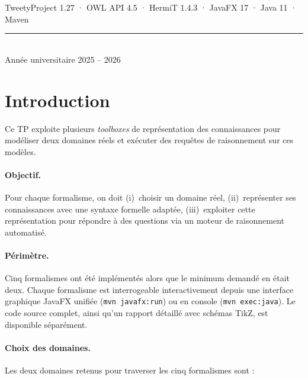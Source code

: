 \documentclass[11pt, a4paper]{article}
\newcommand{\code}[1]{\texttt{#1}}
\begin{document}
\begin{titlepage}
\begin{center}
\vfill

{\small\color{gray}
  TweetyProject 1.27 · OWL API 4.5 · HermiT 1.4.3 · JavaFX 17 · Java 11 · Maven
}\\[1em]

\rule{\linewidth}{0.4pt}\\[0.4em]
{\normalsize Année universitaire 2025 -- 2026}

\end{center}
\end{titlepage}

\section{Introduction}

Ce TP exploite plusieurs \emph{toolboxes} de représentation des connaissances
pour modéliser deux domaines réels et exécuter des requêtes de raisonnement
sur ces modèles.

\paragraph{Objectif.} Pour chaque formalisme, on doit (i)~choisir un domaine
réel, (ii)~représenter ses connaissances avec une syntaxe formelle adaptée,
(iii)~exploiter cette représentation pour répondre à des questions via un
moteur de raisonnement automatisé.

\paragraph{Périmètre.} Cinq formalismes ont été implémentés alors que le
minimum demandé en était deux. Chaque formalisme est interrogeable
interactivement depuis une interface graphique JavaFX unifiée
(\code{mvn javafx:run}) ou en console (\code{mvn exec:java}). Le code source
complet, ainsi qu'un rapport détaillé avec schémas TikZ, est disponible
séparément.

\paragraph{Choix des domaines.} Les deux domaines retenus pour traverser les
cinq formalismes sont :
\end{document}
